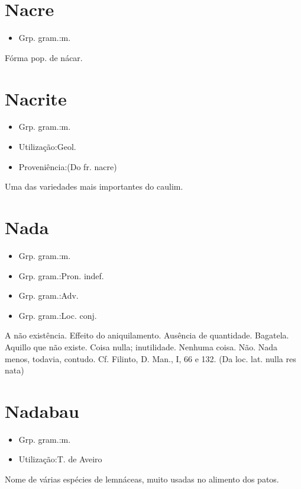 \section{Nacre}
\begin{itemize}
\item {Grp. gram.:m.}
\end{itemize}
Fórma pop. de \textunderscore nácar\textunderscore .
\section{Nacrite}
\begin{itemize}
\item {Grp. gram.:m.}
\end{itemize}
\begin{itemize}
\item {Utilização:Geol.}
\end{itemize}
\begin{itemize}
\item {Proveniência:(Do fr. \textunderscore nacre\textunderscore )}
\end{itemize}
Uma das variedades mais importantes do caulim.
\section{Nada}
\begin{itemize}
\item {Grp. gram.:m.}
\end{itemize}
\begin{itemize}
\item {Grp. gram.:Pron. indef.}
\end{itemize}
\begin{itemize}
\item {Grp. gram.:Adv.}
\end{itemize}
\begin{itemize}
\item {Grp. gram.:Loc. conj.}
\end{itemize}
A não existência.
Effeito do aniquilamento.
Ausência de quantidade.
Bagatela.
Aquillo que não existe.
Coisa nulla; inutilidade.
Nenhuma coisa.
Não.
\textunderscore Nada menos\textunderscore , todavia, contudo. Cf. Filinto, \textunderscore D. Man.\textunderscore , I, 66 e 132.
(Da loc. lat. \textunderscore nulla res nata\textunderscore )
\section{Nadabau}
\begin{itemize}
\item {Grp. gram.:m.}
\end{itemize}
\begin{itemize}
\item {Utilização:T. de Aveiro}
\end{itemize}
Nome de várias espécies de lemnáceas, muito usadas no alimento dos patos.
